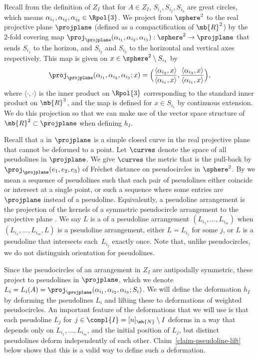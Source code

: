 Recall from the definition of $Z_I$ that for $A \in Z_I$, $S_{i_1},S_{i_2},S_{i_3}$ are great circles, which means $\alpha_{i_1}, \alpha_{i_2},\alpha_{i_3} \in \Rpol{3}$.
We project from $\sphere^2$ to the real projective plane $\projplane$ (defined as a compactification of $\mb{R}^2$) by the 2-fold covering map $\proj_{\projplane}(\alpha_{i_1},\alpha_{i_2},\alpha_{i_3}) : \sphere^2 \to \projplane$ that sends $S_{i_1}$ to the horizon, and $S_{i_2}$ and $S_{i_3}$ to the horizontal and vertical axes respectively.
This map is given on $x \in \sphere^2 \setminus S_{i_1}$ by
\[ \proj_{\projplane}(\alpha_{i_1},\alpha_{i_2},\alpha_{i_3}; x) = \Bigl( \frac{\langle \alpha_{i_2}, x \rangle}{\langle \alpha_{i_1}, x \rangle}, \frac{\langle \alpha_{i_3}, x \rangle}{\langle \alpha_{i_1}, x \rangle} \Bigr), \]
where $\langle \cdot,\cdot \rangle$ is the inner product on $\Rpol{3}$ corresponding to the standard inner product on $\mb{R}^3$,
and the map is defined for $x \in S_{i_1}$ by continuous extension.
We do this projection so that we can make use of the vector space structure of $\mb{R}^2 \subset \projplane$ when defining $h_I$.

Recall that a  in $\projplane$ is a simple closed curve in the real projective plane that cannot be deformed to a point.
Let $\curves$ denote the space of all pseudolines in $\projplane$.
We give $\curves$ the metric that is the pull-back by $\proj_{\projplane}(e_1,e_2,e_3)$ of Fréchet distance on pseudocircles in $\sphere^2$.
By  we mean a sequence of pseudolines such that each pair of pseudolines either coincide or intersect at a single point, or such a sequence where some entries are $\projplane$ instead of a pseudoline.
Equivalently, a pseudoline arrangement is the projection of the kernels of a symmetric pseudocircle arrangement to the projective plane \cite[\S 6.2]{bjorner1999oriented}.
We say $L$ is a  of a pseudoline arrangement $(L_{i_1},\dots,L_{i_m})$ when $(L_{i_1},\dots,L_{i_m},L)$ is a pseudoline arrangement, \ie either $L = L_{i_j}$ for some $j$, or $L$ is a pseudoline that intersects each~$L_{i_j}$ exactly once.
Note that, unlike pseudocircles, we do not distinguish orientation for pseudolines.

Since the pseudocircles of an arrangement in $Z_I$ are antipodally symmetric, these project to pseudolines in $\projplane$, which we denote $L_i = L_i(A) = \proj_{\projplane}(\alpha_{i_1},\alpha_{i_2},\alpha_{i_3};S_i)$.
We will define the deformation $h_I$ by deforming the pseudolines $L_i$ and lifting these to deformations of weighted pseudocircles.
An important feature of the deformations that we will use is that each pseudoline $L_j$ for $j \in \compl{I} = [n]_\mb{N} \setminus I$ deforms in a way that depends only on $L_{i_1},\dots,L_{i_m}$, and the initial position of $L_{j}$, but distinct pseudolines deform independently of each other.
Claim~\ref{claim-pseudoline-lift} below shows that this is a valid way to define such a deformation.

